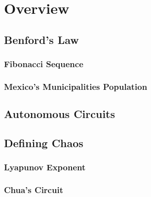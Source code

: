 \maketitle %


\section{Overview}


\subsection{Benford's Law}


\subsubsection{Fibonacci Sequence}


\subsubsection{Mexico's Municipalities Population}


\subsection{Autonomous Circuits}


\subsection{Defining Chaos}


\subsubsection{Lyapunov Exponent}


\subsubsection{Chua's Circuit}


